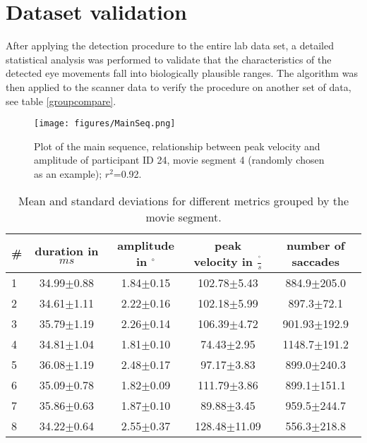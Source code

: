 \documentclass[10pt,a4paper,twocolumn]{article}
\begin{document}
\section*{Dataset validation}
After applying the detection procedure to the entire lab data set, a detailed statistical analysis was performed to validate that the characteristics of the detected eye movements fall into biologically plausible ranges. The algorithm was then applied to the scanner data to verify the procedure on another set of data, see table \ref{groupcompare}. 


\onecolumn

\begin{figure}
\centering
\texttt{[image: figures/MainSeq.png]}
        \caption[Main sequence plot]{Plot of the main sequence, relationship between peak velocity and amplitude of participant ID 24, movie segment 4 (randomly chosen as an example); $r^2$=0.92.}
        \label{main}
\end{figure}   
\begin{table}[h]
\center
\begin{tabular}{lcccc}
\toprule
\# & duration in $ms$  & amplitude in $^\circ$ & peak velocity in $\frac{^\circ} {s}$ & number of saccades \\
\midrule
1	& 	34.99$\pm$0.88 	& 	1.84$\pm$0.15   & 	102.78$\pm$5.43 	& 	884.9$\pm$205.0  	\\
2 	& 	34.61$\pm$1.11 	&	2.22$\pm$0.16	&  	102.18$\pm$5.99		& 	897.3$\pm$72.1 		\\
3	&   35.79$\pm$1.19	&   2.26$\pm$0.14 	&  	106.39$\pm$4.72		& 	901.93$\pm$192.9 	\\
4 	& 	34.81$\pm$1.04 	&  	1.81$\pm$0.10 	& 	74.43$\pm$2.95		&	1148.7$\pm$191.2 	\\
5 	& 	36.08$\pm$1.19 	&	2.48$\pm$0.17 	& 	97.17$\pm$3.83 		& 	899.0$\pm$240.3 	\\
6	& 	35.09$\pm$0.78 	& 	1.82$\pm$0.09 	& 	111.79$\pm$3.86 	&	899.1$\pm$151.1 	\\
7	& 	35.86$\pm$0.63	& 	1.87$\pm$0.10 	&  	89.88$\pm$3.45		& 	959.5$\pm$244.7		\\
8	& 	34.22$\pm$0.64 	& 	2.55$\pm$0.37 	& 	128.48$\pm$11.09	& 	556.3$\pm$218.8		\\

\bottomrule

\end{tabular}
\caption {Mean and standard deviations for different metrics grouped by the movie segment.}
\label{rundetails1} 
\end{table}
\end{document}
